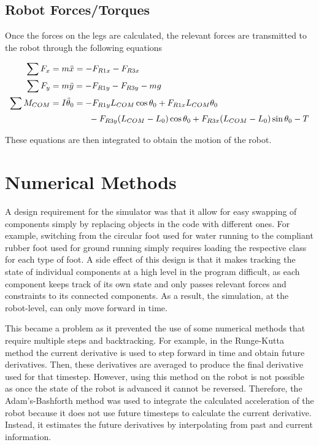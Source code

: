 \documentclass[letterpaper]{article}
\begin{document}
\subsection{Robot Forces/Torques}
Once the forces on the legs are calculated, the relevant forces are transmitted to the robot through the following equations

\begin{align}
	\sum F_x &= m \ddot{x} = -F_{R1x} - F_{R3x}  \\
	\sum F_y &= m \ddot{y} = -F_{R1y} - F_{R3y} - mg \\
	\sum M_{COM} &= I \ddot{\theta}_0 = -F_{R1y} L_{COM} \cos \theta_0 + F_{R1x} L_{COM} \theta_0 \notag \\
		& \phantom{I \ddot{\theta}_0 =} \qquad - F_{R3y} (L_{COM} - L_0) \cos \theta_0 + F_{R3x} (L_{COM} - L_0) \sin \theta_0 - T
\end{align}

\noindent These equations are then integrated to obtain the motion of the robot.

\section{Numerical Methods}

A design requirement for the simulator was that it allow for easy swapping of components simply by replacing objects in the code with different ones. For example, switching from the circular foot used for water running to the compliant rubber foot used for ground running simply requires loading the respective class for each type of foot. A side effect of this design is that it makes tracking the state of individual components at a high level in the program difficult, as each component keeps track of its own state and only passes relevant forces and constraints to its connected components. As a result, the simulation, at the robot-level, can only move forward in time.

This became a problem as it prevented the use of some numerical methods that require multiple steps and backtracking. For example, in the Runge-Kutta method the current derivative is used to step forward in time and obtain future derivatives. Then, these derivatives are averaged to produce the final derivative used for that timestep. However, using this method on the robot is not possible as once the state of the robot is advanced it cannot be reversed. Therefore, the Adam's-Bashforth method was used to integrate the calculated acceleration of the robot because it does not use future timesteps to calculate the current derivative. Instead, it estimates the future derivatives by interpolating from past and current information.
\end{document}
